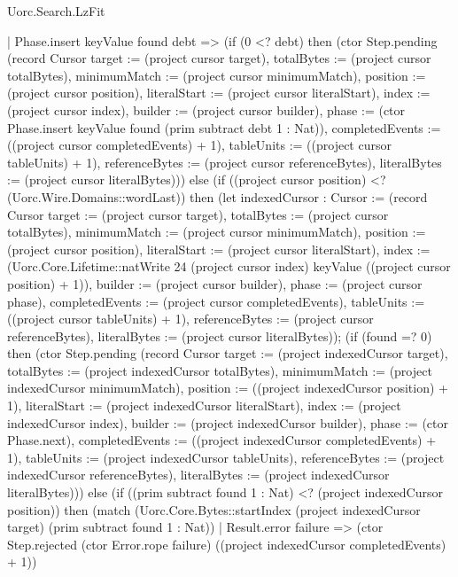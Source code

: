 \begin{lexlean}{Uorc.Search.LzFit}
\begin{semanticmodule}
{    | Phase.insert keyValue found debt => (if (0 <? debt) then (ctor Step.pending (record Cursor {target := (project cursor target), totalBytes := (project cursor totalBytes), minimumMatch := (project cursor minimumMatch), position := (project cursor position), literalStart := (project cursor literalStart), index := (project cursor index), builder := (project cursor builder), phase := (ctor Phase.insert keyValue found (prim subtract debt 1 : Nat)), completedEvents := ((project cursor completedEvents) + 1), tableUnits := ((project cursor tableUnits) + 1), referenceBytes := (project cursor referenceBytes), literalBytes := (project cursor literalBytes)})) else (if ((project cursor position) <? (Uorc.Wire.Domains::wordLast)) then (let indexedCursor : Cursor := (record Cursor {target := (project cursor target), totalBytes := (project cursor totalBytes), minimumMatch := (project cursor minimumMatch), position := (project cursor position), literalStart := (project cursor literalStart), index := (Uorc.Core.Lifetime::natWrite 24 (project cursor index) keyValue ((project cursor position) + 1)), builder := (project cursor builder), phase := (project cursor phase), completedEvents := (project cursor completedEvents), tableUnits := ((project cursor tableUnits) + 1), referenceBytes := (project cursor referenceBytes), literalBytes := (project cursor literalBytes)}); (if (found =? 0) then (ctor Step.pending (record Cursor {target := (project indexedCursor target), totalBytes := (project indexedCursor totalBytes), minimumMatch := (project indexedCursor minimumMatch), position := ((project indexedCursor position) + 1), literalStart := (project indexedCursor literalStart), index := (project indexedCursor index), builder := (project indexedCursor builder), phase := (ctor Phase.next), completedEvents := ((project indexedCursor completedEvents) + 1), tableUnits := (project indexedCursor tableUnits), referenceBytes := (project indexedCursor referenceBytes), literalBytes := (project indexedCursor literalBytes)})) else (if ((prim subtract found 1 : Nat) <? (project indexedCursor position)) then (match (Uorc.Core.Bytes::startIndex (project indexedCursor target) (prim subtract found 1 : Nat))
      | Result.error failure => (ctor Step.rejected (ctor Error.rope failure) ((project indexedCursor completedEvents) + 1))
}
\end{semanticmodule}
\end{lexlean}
